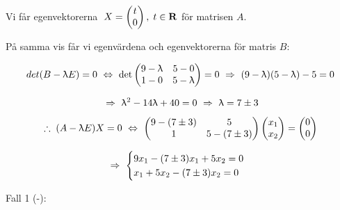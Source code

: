 \documentclass{article}
\begin{document}
\begin{enumerate}
        \vskip 0.2cm

        Vi får egenvektorerna $\; X=\begin{pmatrix} 
           t \\
           0
        \end{pmatrix}, \; t\in\mathbf{R}
        $ för matrisen $A$.

        \vskip 0.3cm

        På samma vis får vi egenvärdena och egenvektorerna för matris $B$:

        \vskip 0.3cm

        $$
        det(B-\uplambda E)=0 
        \ \Leftrightarrow \  
        \det\begin{pmatrix}
            9-\uplambda & 5-0 \\
            1-0 & 5-\uplambda 
        \end{pmatrix}
        =0
        \ \Rightarrow \ 
        (9-\uplambda)(5-\uplambda)-5=0
        $$

        \vskip 0.3cm

        $$
        \ \Rightarrow \ 
        \uplambda^2-14\uplambda+40=0
        \ \Rightarrow \ 
        \uplambda=7\pm3
        $$

        \vskip 0.3cm

        $$
        \therefore \; (A-\uplambda E)X=0 
        \ \Leftrightarrow \ 
        \begin{pmatrix}
            9-(7\pm3) & 5 \\
            1 & 5-(7\pm3)
        \end{pmatrix}
        \begin{pmatrix}
            x_{1} \\
            x_{2}
        \end{pmatrix}
        =
        \begin{pmatrix}
            0 \\
            0
        \end{pmatrix}
        $$

        \newpage

        $$
        \ \Rightarrow \ 
        \begin{cases}
            9x_{1}-(7\pm3)x_{1}+5x_{2}=0 \\
            x_{1}+5x_{2}-(7\pm3)x_{2}=0
        \end{cases}
        $$

        \vskip 0.3cm

        Fall 1 (-):

        \vskip -0.2cm


\end{enumerate}
\end{document}
